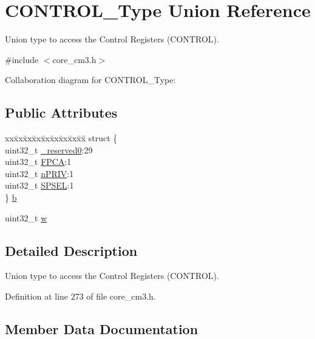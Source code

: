 \hypertarget{unionCONTROL__Type}{}\section{C\+O\+N\+T\+R\+O\+L\+\_\+\+Type Union Reference}
\label{unionCONTROL__Type}


Union type to access the Control Registers (C\+O\+N\+T\+R\+OL).  




{\ttfamily \#include $<$core\+\_\+cm3.\+h$>$}



Collaboration diagram for C\+O\+N\+T\+R\+O\+L\+\_\+\+Type\+:
\subsection*{Public Attributes}
\begin{DoxyCompactItemize}
\item 
\begin{tabbing}
xx\=xx\=xx\=xx\=xx\=xx\=xx\=xx\=xx\=\kill
struct \{\\
\>uint32\_t \hyperlink{unionCONTROL__Type_af8c314273a1e4970a5671bd7f8184f50}{\_reserved0}:29\\
\>uint32\_t \hyperlink{unionCONTROL__Type_ac62cfff08e6f055e0101785bad7094cd}{FPCA}:1\\
\>uint32\_t \hyperlink{unionCONTROL__Type_a35c1732cf153b7b5c4bd321cf1de9605}{nPRIV}:1\\
\>uint32\_t \hyperlink{unionCONTROL__Type_a8cc085fea1c50a8bd9adea63931ee8e2}{SPSEL}:1\\
\} \hyperlink{unionCONTROL__Type_adc6a38ab2980d0e9577b5a871da14eb9}{b}\\

\end{tabbing}\item 
uint32\+\_\+t \hyperlink{unionCONTROL__Type_a6b642cca3d96da660b1198c133ca2a1f}{w}
\end{DoxyCompactItemize}


\subsection{Detailed Description}
Union type to access the Control Registers (C\+O\+N\+T\+R\+OL). 

Definition at line 273 of file core\+\_\+cm3.\+h.



\subsection{Member Data Documentation}
